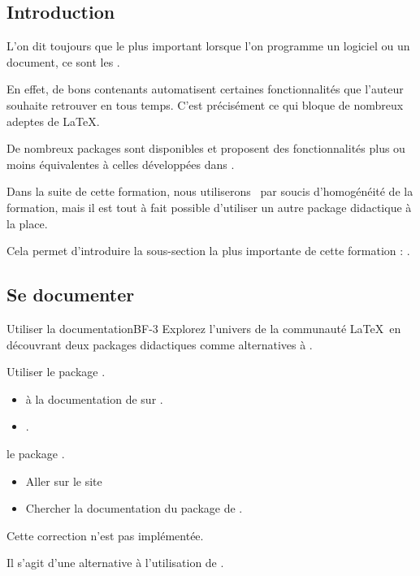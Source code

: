 \subsection{Introduction}


L'on dit toujours que le plus important lorsque l'on programme un logiciel ou un document, ce sont les . 

En effet, de bons contenants automatisent certaines fonctionnalités que l'auteur souhaite retrouver en tous temps. 
C'est précisément ce qui bloque de nombreux adeptes de \LaTeX. 

De nombreux packages sont disponibles et proposent des fonctionnalités plus ou moins équivalentes à celles développées dans \bfcours. 

Dans la suite de cette formation, nous utiliserons \bfcours\ par soucis d'homogénéité de la formation, mais il est tout à fait possible d'utiliser un autre package didactique à la place. 

Cela permet d'introduire la sous-section la plus importante de cette formation : .

\subsection{Se documenter}

\begin{EXO}{Utiliser la documentation}{BF-3}
    Explorez l'univers de la communauté \LaTeX\ en découvrant deux packages didactiques comme alternatives à \bfcours. 

    \begin{tcbenumerate}[2]
        \tcbitem {} Utiliser le package .
        \begin{itemize}[label=$\bullet$]
            \item {} à la documentation de  sur .
            \item {}. 
        \end{itemize}
        \tcbitem {}  le package . 
        \begin{itemize}[label=$\bullet$]
            \item Aller sur le site 
            \item Chercher la documentation du package  de . 
        \end{itemize}
    \end{tcbenumerate}
    \exocorrection

    Cette correction n'est pas implémentée. 

    Il s'agit d'une alternative à l'utilisation de \bfcours.
\end{EXO}
